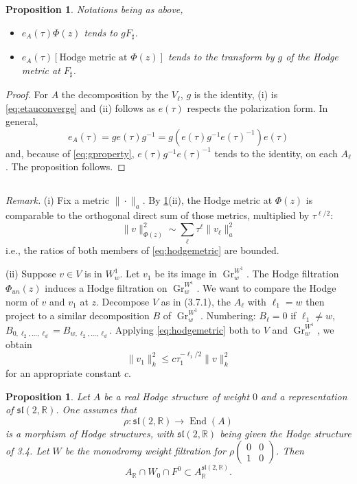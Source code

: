 \documentclass[11pt,a4paper]{article}
\theoremstyle{plain}
\newtheorem{proposition}[theorem]{Proposition}
\theoremstyle{definition}
\DeclareMathOperator{\End}{End}
\DeclareMathOperator{\Gr}{Gr}
\begin{document}
\begin{proposition}\label{prop:etau}
Notations being as above,
\begin{itemize}
\item[(i)] $e_A(\tau)\Phi(z)$ tends to $gF_{\sharp}$.
\item[(ii)] $e_A(\tau)[\text{Hodge metric at }\Phi(z)]$ tends to the transform by $g$ of the Hodge metric at $F_{\sharp}$.
\end{itemize}
\end{proposition}

\begin{proof}
For $A$ the decomposition by the $V_{\ell}$, $g$ is the identity, (i) is \eqref{eq:etauconverge} and (ii) follows as $e(\tau)$ respects the polarization form. In general,
\[
e_A(\tau)=ge(\tau)g^{-1}=g(e(\tau)g^{-1}e(\tau)^{-1})e(\tau)
\]
and, because of \eqref{eq:gproperty}, $e(\tau)g^{-1}e(\tau)^{-1}$ tends to the identity, on each $A_{\ell}$. The proposition follows.
\end{proof}

\subsection{}
\textit{Remark.} (i) Fix a metric $\|\cdot\|_a$. By \ref{prop:etau}(ii), the Hodge metric at $\Phi(z)$ is comparable to the orthogonal direct sum of those metrics, multiplied by $\tau^{\ell/2}$:
\begin{equation}\label{eq:hodgemetric}
\|v\|_{\Phi(z)}^2\sim\sum_{\ell}\tau^{\ell}\|v_{\ell}\|_a^2
\end{equation}
i.e., the ratios of both members of \eqref{eq:hodgemetric} are bounded.

(ii) Suppose $v\in V$ is in $W^1_w$. Let $v_1$ be its image in $\Gr_w^{W^1}$. The Hodge filtration $\Phi_{un}(z)$ induces a Hodge filtration on $\Gr_w^{W^1}$. We want to compare the Hodge norm of $v$ and $v_1$ at $z$. Decompose $V$ as in (3.7.1), the $A_{\ell}$ with $\ell_1=w$ then project to a similar decomposition $B$ of $\Gr_w^{W^1}$. Numbering: $B_{\ell}=0$ if $\ell_1\neq w$, $B_{0,\ell_2,\dots,\ell_d}=B_{w,\ell_2,\dots,\ell_d}$. Applying \eqref{eq:hodgemetric} both to $V$ and $\Gr_w^{W^1}$, we obtain
\[
\|v_1\|_k^2\leq c\tau_1^{-\ell_1/2}\|v\|_k^2
\]
for an appropriate constant $c$.

\begin{proposition}\label{prop:sl2}
Let $A$ be a real Hodge structure of weight $0$ and a representation of $\mathfrak{sl}(2,\mathbb{R})$. One assumes that
\[
\rho:\mathfrak{sl}(2,\mathbb{R})\to\End(A)
\]
is a morphism of Hodge structures, with $\mathfrak{sl}(2,\mathbb{R})$ being given the Hodge structure of 3.4. Let $W$ be the monodromy weight filtration for $\rho\begin{pmatrix} 0 & 0 \\ 1 & 0\end{pmatrix}$. Then
\[
A_{\mathbb{R}}\cap W_0\cap F^0\subset A_{\mathbb{R}}^{\mathfrak{sl}(2,\mathbb{R})}.
\]
\end{proposition}
\end{document}
